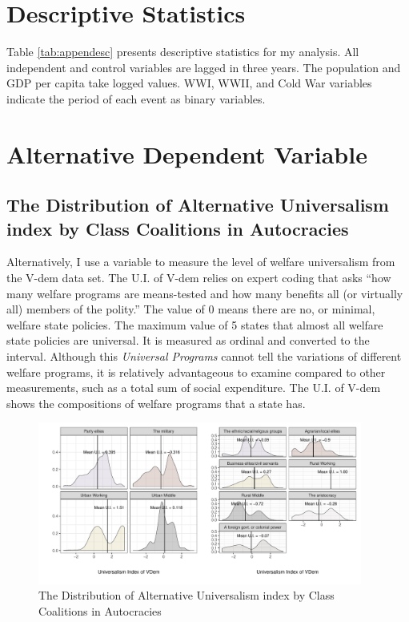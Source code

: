 \documentclass[12pt]{article}
\begin{document}
	\section{Descriptive Statistics}
	
	Table \ref{tab:appendesc} presents descriptive statistics for my analysis. All independent and control variables are lagged in three years. The population and GDP per capita take logged values. WWI, WWII, and Cold War variables indicate the period of each event as binary variables. 
	
	
	
	\section{Alternative Dependent Variable}
	\subsection{The Distribution of Alternative Universalism index by Class Coalitions in Autocracies}
	Alternatively, I use a variable to measure the level of welfare universalism from the V-dem data set. The U.I. of V-dem relies on expert coding that asks ``how many welfare programs are means-tested and how many benefits all (or virtually all) members of the polity.'' The value of 0 means there are no, or minimal, welfare state policies. The maximum value of 5 states that almost all welfare state policies are universal. It is measured as ordinal and converted to the interval. Although this \textit{Universal Programs} cannot tell the variations of different welfare programs, it is relatively advantageous to examine compared to other measurements, such as a total sum of social expenditure. The U.I. of V-dem shows the compositions of welfare programs that a state has.
	
	\begin{figure}[!ht]
		\centering
		\includegraphics[width=0.95\textwidth]{"2_Figures/Appendix/Appendix5"}
		\caption{The Distribution of Alternative Universalism index by Class Coalitions in Autocracies}
		\label{fig:figure9}
	\end{figure}
	
\end{document}
